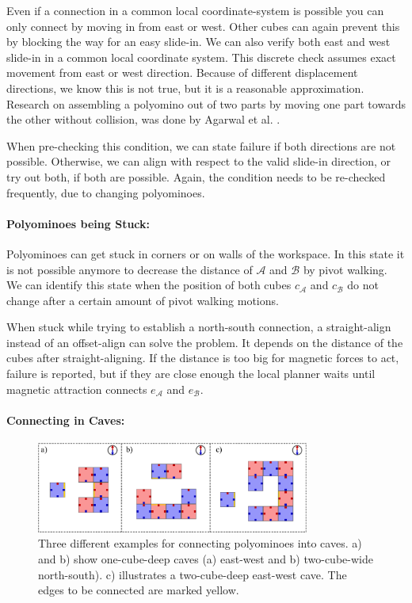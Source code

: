 Even if a connection in a common local coordinate-system is possible you can only connect by moving in from east or west.
Other cubes can again prevent this by blocking the way for an easy slide-in.
We can also verify both east and west slide-in in a common local coordinate system.
This discrete check assumes exact movement from east or west direction.
Because of different displacement directions, we know this is not true, but it is a reasonable approximation.
Research on assembling a polyomino out of two parts by moving one part towards the other without collision, was done by Agarwal et al. \cite{agarwal2021}. 

When pre-checking this condition, we can state failure if both directions are not possible.
Otherwise, we can align with respect to the valid slide-in direction, or try out both, if both are possible.
Again, the condition needs to be re-checked frequently, due to changing polyominoes.

\paragraph{Polyominoes being Stuck:}

Polyominoes can get stuck in corners or on walls of the workspace.
In this state it is not possible anymore to decrease the distance of $\mathcal{A}$ and $\mathcal{B}$ by pivot walking.
We can identify this state when the position of both cubes $c_\mathcal{A}$ and $c_\mathcal{B}$ do not change after a certain amount of pivot walking motions.

When stuck while trying to establish a north-south connection, a straight-align instead of an offset-align can solve the problem.
It depends on the distance of the cubes after straight-aligning.
If the distance is too big for magnetic forces to act, failure is reported, but if they are close enough the local planner waits until magnetic attraction connects $e_\mathcal{A}$ and $e_\mathcal{B}$.


\paragraph{Connecting in Caves:}

\begin{figure}
	\centering
	\includegraphics[width=0.80\textwidth]{figures/caves.pdf}
	\caption[Examples for connecting polyominoes into caves]{Three different examples for connecting polyominoes into caves. a) and b) show one-cube-deep caves (a) east-west and b) two-cube-wide north-south). c) illustrates a two-cube-deep east-west cave. The edges to be connected are marked yellow.}
	\label{fig:caves}
\end{figure}

